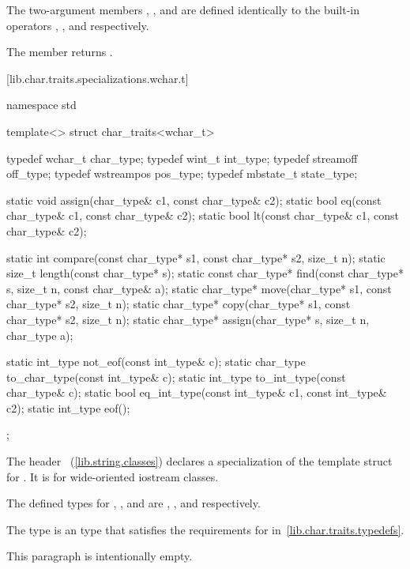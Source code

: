 \pnum
The two-argument members , ,
and  are defined identically to the built-in operators
\tcode{=}, \tcode{==}, and \tcode{<} respectively.

\pnum
The member
returns
.

[lib.char.traits.specializations.wchar.t]{}

%
\begin{codeblock}
namespace std {
  template<>
  struct char_traits<wchar_t> {
    typedef wchar_t      char_type;
    typedef wint_t       int_type;
    typedef streamoff   off_type;
    typedef wstreampos   pos_type;
    typedef mbstate_t    state_type;

    static void assign(char_type& c1, const char_type& c2);
    static bool eq(const char_type& c1, const char_type& c2);
    static bool lt(const char_type& c1, const char_type& c2);

    static int compare(const char_type* s1, const char_type* s2, size_t n);
    static size_t length(const char_type* s);
    static const char_type* find(const char_type* s, size_t n,
                                 const char_type& a);
    static char_type* move(char_type* s1, const char_type* s2, size_t n);
    static char_type* copy(char_type* s1, const char_type* s2, size_t n);
    static char_type* assign(char_type* s, size_t n, char_type a);

    static int_type not_eof(const int_type& c);
    static char_type to_char_type(const int_type& c);
    static int_type to_int_type(const char_type& c);
    static bool eq_int_type(const int_type& c1, const int_type& c2);
    static int_type eof();
  };
}
\end{codeblock}

The header ~(\ref{lib.string.classes}) declares a
specialization of the template struct  for .
It is for wide-oriented iostream classes.

\pnum
The defined types for
,
,
and
are
,
,
and
respectively.

\pnum
The type
is an  type that satisfies the requirements
for  in~\ref{lib.char.traits.typedefs}.

\pnum
\enternote
This paragraph is intentionally empty.
\exitnoteb


